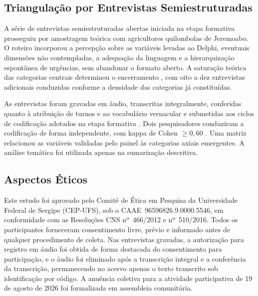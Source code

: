 \documentclass[preprint,authoryear,12pt]{elsarticle}
\begin{document}

\subsection{Triangulação por Entrevistas Semiestruturadas}

A série de entrevistas semiestruturadas abertas iniciada na etapa formativa prosseguiu por amostragem teórica com agricultores quilombolas de Jeremoabo. O roteiro incorporou a percepção sobre as variáveis levadas ao Delphi, eventuais dimensões não contempladas, a adequação da linguagem e a hierarquização espontânea de urgências, sem abandonar o formato aberto. A saturação teórica das categorias centrais determinou o encerramento \citep{Glaser1967}, com oito a dez entrevistas adicionais conduzidas conforme a densidade das categorias já constituídas.

As entrevistas foram gravadas em áudio, transcritas integralmente, conferidas quanto à atribuição de turnos e ao vocabulário vernacular e submetidas aos ciclos de codificação adotados na etapa formativa \citep{CorbinStrauss2015,Saldana2021}. Dois pesquisadores conduziram a codificação de forma independente, com kappa de Cohen $\geq 0{,}60$ \citep{Landis1977}. Uma matriz relacionou as variáveis validadas pelo painel às categorias axiais emergentes. A análise temática \citep{Braun2006} foi utilizada apenas na sumarização descritiva.

\subsection{Aspectos Éticos}

Este estudo foi aprovado pelo Comitê de Ética em Pesquisa da Universidade Federal de Sergipe (CEP-UFS), sob o CAAE~96596826.9.0000.5546, em conformidade com as Resoluções CNS nº~466/2012 e nº~510/2016. Todos os participantes forneceram consentimento livre, prévio e informado antes de qualquer procedimento de coleta. Nas entrevistas gravadas, a autorização para registro em áudio foi obtida de forma destacada do consentimento para participação, e o áudio foi eliminado após a transcrição integral e a conferência da transcrição, permanecendo no acervo apenas o texto transcrito sob identificação por código. A anuência coletiva para a atividade participativa de 19 de agosto de 2026 foi formalizada em assembleia comunitária.
\end{document}
